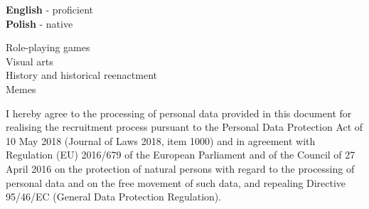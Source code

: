\documentclass[9pt]{style/developercv}
\begin{document}
\begin{minipage}[t]{0.3\textwidth}
	\vspace{-\baselineskip}


	\textbf{English} - proficient\\
	\textbf{Polish} - native
\end{minipage}
\hfill
\begin{minipage}[t]{0.3\textwidth}
	\vspace{-\baselineskip}
	
	
	Role-playing games\\
	Visual arts\\
	History and historical reenactment\\
	Memes
\end{minipage}


\vspace{1.00cm}

\begin{minipage}[t]{1\textwidth}
	I hereby agree to the processing of personal data provided in this document for 
	realising the recruitment process pursuant to the Personal Data Protection Act
	of 10 May 2018 (Journal of Laws 2018, item 1000) and in agreement with Regulation (EU) 
	2016/679 of the European Parliament and of the Council of 27 April 2016 on the 
	protection of natural persons with regard to the processing of personal data and on 
	the free movement of such data, and repealing Directive 95/46/EC (General Data 
	Protection Regulation).
\end{minipage}
\end{document}
